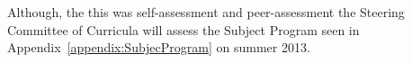 Although, the this was self-assessment and peer-assessment the Steering Committee of Curricula will assess the Subject Program seen in Appendix~\ref{appendix:SubjecProgram} on summer 2013.

%
%
%

